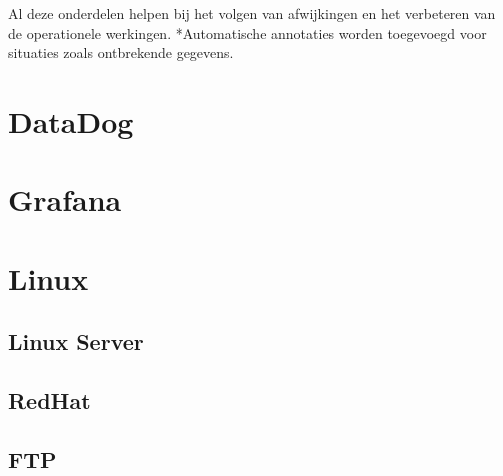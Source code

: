 Al deze onderdelen helpen bij het volgen van afwijkingen en het verbeteren van de operationele werkingen.
*Automatische annotaties worden toegevoegd voor situaties zoals ontbrekende gegevens. ~\autocite{Elatic(2)} 

\section{DataDog}

\section{Grafana}

\section{Linux}

\subsection{Linux Server}

\subsection{RedHat}

\subsection{FTP}